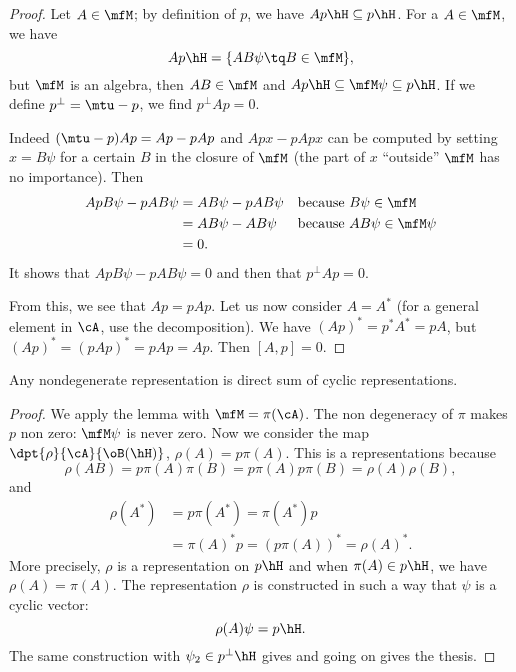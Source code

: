 \begin{proof}
Let $A\in\mfM$; by definition of $p$, we have $Ap\hH\subseteq p\hH$. For a $A\in\mfM$, we have 
\begin{equation}
    Ap\hH=\{ AB\psi\tq B\in\mfM \}, 
\end{equation}
but $\mfM$ is an algebra, then $AB\in\mfM$ and $Ap\hH\subseteq\mfM\psi\subseteq p\hH$. If we define $p^{\perp}=\mtu-p$, we find $p^{\perp}Ap=0$.

 Indeed $(\mtu-p)Ap=Ap-pAp$ and $Apx-pApx$ can be computed by setting $x=B\psi$ for a certain $B$ in the closure of $\mfM$ (the part of $x$ ``outside'' $\mfM$ has no importance). Then
\begin{equation}
\begin{aligned}
   ApB \psi-pAB\psi&=AB\psi-pAB\psi  &&\textrm{because $B\psi\in\mfM$}\\
        &=AB\psi-AB\psi  &&\textrm{because $AB\psi\in\mfM\psi$}\\
        &=0.
\end{aligned}
\end{equation}
It shows that $ApB\psi-pAB\psi=0$ and then that $p^{\perp}Ap=0$.

From this, we see that $Ap=pAp$. Let us now consider $A=A^*$ (for a general element in $\cA$, use the decomposition). We have $(Ap)^*=p^*A^*=pA$, but $(Ap)^*=(pAp)^*=pAp=Ap$. Then $[A,p]=0$.


\end{proof}


\begin{proposition}
Any nondegenerate representation is direct sum of cyclic representations.
\end{proposition}

\begin{proof}
We apply the lemma with $\mfM=\pi(\cA)$. The non degeneracy of $\pi$ makes $p$ non zero: $\mfM\psi$ is never zero. Now we consider the map $\dpt{\rho}{\cA}{\oB(\hH)}$, $\rho(A)=p \pi(A)$. This is a representations because
\begin{equation}
    \rho(AB)=p\pi(A)\pi(B)
        =p\pi(A)p\pi(B)
        =\rho(A)\rho(B),
\end{equation}
and
\begin{equation}
\begin{split}
\rho(A^*)&=p\pi(A^*)=\pi(A^*)p\\
        &=\pi(A)^*p=(p\pi(A))^*=\rho(A)^*.
\end{split}
\end{equation}
More precisely, $\rho$ is a representation on $p\hH$ and when $\pi(A)\in p\hH$, we have $\rho(A)=\pi(A)$. The representation $\rho$ is constructed in such a way that $\psi$ is a cyclic vector:
\[
  \rho(A)\psi=p\hH.
\]
The same construction with $\psi_2\in p^{\perp}\hH$ gives and going on gives the thesis.
\end{proof}


